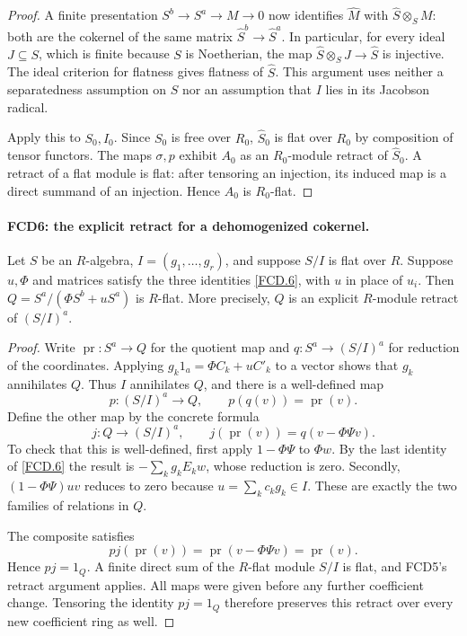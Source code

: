 \begin{proof}
A finite presentation $S^b\to S^a\to M\to0$ now identifies
$\widehat M$ with $\widehat S\otimes_SM$: both are the
cokernel of the same matrix $\widehat S^b\to\widehat S^a$.
In particular, for every ideal $J\subseteq S$, which is finite
because $S$ is Noetherian, the map
$\widehat S\otimes_SJ\to\widehat S$ is injective.
The ideal criterion for flatness gives flatness of $\widehat S$.
This argument uses neither a separatedness assumption on $S$
nor an assumption that $I$ lies in its Jacobson radical.

Apply this to $S_0,I_0$.  Since $S_0$ is free over $R_0$,
$\widehat S_0$ is flat over $R_0$ by composition of tensor
functors.  The maps $\sigma,p$ exhibit $A_0$ as an $R_0$-module
retract of $\widehat S_0$.  A retract of a flat module is flat:
after tensoring an injection, its induced map is a direct summand
of an injection.  Hence $A_0$ is $R_0$-flat.
\end{proof}

\paragraph{FCD6: the explicit retract for a dehomogenized cokernel.}
\label{claim:FCD6}
Let $S$ be an $R$-algebra, $I=(g_1,\ldots,g_r)$, and suppose
$S/I$ is flat over $R$.  Suppose $u,\Phi$ and matrices satisfy
the three identities \eqref{FCD.6}, with $u$ in place of $u_i$.
Then
$Q=S^a/(\Phi S^b+uS^a)$ is $R$-flat.  More precisely, $Q$ is
an explicit $R$-module retract of $(S/I)^a$.

\begin{proof}
Write $\operatorname{pr}:S^a\to Q$ for the quotient map and
$q:S^a\to(S/I)^a$ for reduction of the coordinates.
Applying $g_k1_a=\Phi C_k+uC'_k$ to a vector shows that
$g_k$ annihilates $Q$.  Thus $I$ annihilates $Q$, and there is
a well-defined map
\[
 p:(S/I)^a\longrightarrow Q,\qquad p(q(v))=\operatorname{pr}(v).
\]
Define the other map by the concrete formula
\[
 j:Q\longrightarrow(S/I)^a,\qquad
 j(\operatorname{pr}(v))=q(v-\Phi\Psi v).             \tag{FCD.8}\label{FCD.8}
\]
To check that this is well-defined, first apply $1-\Phi\Psi$
to $\Phi w$.  By the last identity of \eqref{FCD.6} the result
is $-\sum_k g_kE_kw$, whose reduction is zero.  Secondly,
$(1-\Phi\Psi)uv$ reduces to zero because
$u=\sum_kc_kg_k\in I$.  These are exactly the two families
of relations in $Q$.

The composite satisfies
\[
 p j(\operatorname{pr}(v))
 =\operatorname{pr}(v-\Phi\Psi v)=\operatorname{pr}(v).
\]
Hence $pj=1_Q$.  A finite direct sum of the $R$-flat module
$S/I$ is flat, and FCD5's retract argument applies.  All maps
were given before any further coefficient change.  Tensoring the
identity $pj=1_Q$ therefore preserves this retract over every
new coefficient ring as well.
\end{proof}

